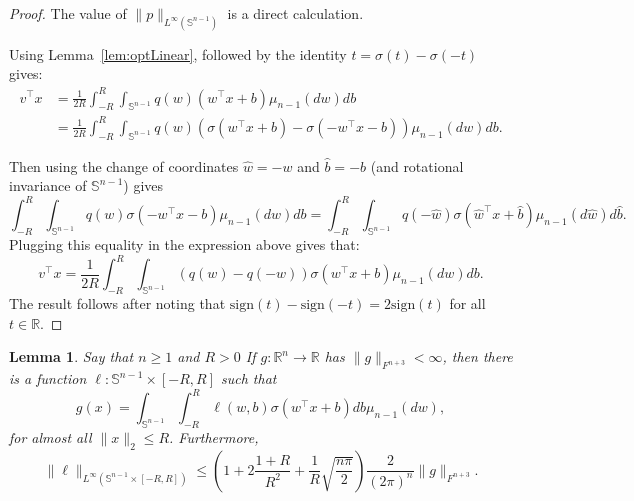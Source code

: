 \documentclass[twoside]{article}
\newtheorem{lemma}{Lemma}
\theoremstyle{definition}
\newcommand{\R}{\mathbb{R}}
\renewcommand{\S}{\mathbb{S}}
\newcommand{\sign}{\mathrm{sign}}
\newcommand{\1}[1]{\scalebox{1.25}{$\mathds{1}$}\left[#1\right]}
\begin{document}
\begin{proof}
The value of $\|p\|_{L^{\infty}(\S^{n-1})}$ is a direct calculation. 

Using Lemma~\ref{lem:optLinear}, followed by the identity $t=\sigma(t)-\sigma(-t)$ gives:
\begin{align*}
v^\top x &= \frac{1}{2R}\int_{-R}^R\int_{\S^{n-1}}q(w)\left(w^\top x+b\right)\mu_{n-1}(dw)db \\
&=\frac{1}{2R}\int_{-R}^R\int_{\S^{n-1}}q(w)\left(\sigma\left(w^\top x+b\right)
-\sigma\left(-w^\top x-b\right)
\right)
\mu_{n-1}(dw)db.
\end{align*}

Then using the change of coordinates $\hat w = -w$ and $\hat b=-b$ (and rotational invariance of $\S^{n-1}$) gives
$$
\int_{-R}^R\int_{\S^{n-1}}q(w)\sigma(-w^\top x-b)\mu_{n-1}(dw)db=\int_{-R}^R\int_{\S^{n-1}}q(-\hat w)\sigma(\hat w^\top x +\hat b)\mu_{n-1}(d\hat w)d\hat b.
$$
Plugging this equality in the expression above gives that:
$$
v^\top x = \frac{1}{2R}\int_{-R}^R\int_{\S^{n-1}}\left(q(w)-q(-w)\right)\sigma(w^\top x + b)\mu_{n-1}(dw)db.
$$
The result follows after noting that $\sign(t)-\sign(-t)=2\sign(t)$ for all $t\in\R$.
\end{proof}

\begin{lemma}
\label{lem:integralNoAffine}
Say that $n\ge 1$ and $R>0$
If $g:\R^n\to\R$ has $\|g\|_{F^{n+3}}<\infty$, then there is a function $\ell:\S^{n-1}\times [-R,R]$ such that 
\begin{equation}
\label{eq:integralNoAffine}
g(x)=\int_{\S^{n-1}}\int_{-R}^R \ell(w,b) \sigma(w^\top x + b)db \mu_{n-1}(dw),
\end{equation}
for almost all $\|x\|_2\le R$. Furthermore,
$$
\|\ell\|_{L^{\infty}(\S^{n-1}\times [-R,R])}\le 
\left(1+2\frac{1+R}{R^2}+\frac{1}{R}\sqrt{\frac{n \pi}{2}}\right)
\frac{2}{(2\pi)^n}
\|g\|_{F^{n+3}}.
$$
\end{lemma}
\end{document}
